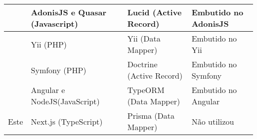 \begin{table}[h]
\begin{tabularx}{\textwidth}{ 
			| >{\hsize=0.4\hsize}X
			| >{\hsize=0.5\hsize}X	
			| >{\hsize=0.7\hsize}X
			| >{\hsize=0.4\hsize}X
			|
		}
     	\citeonline{dalapicola:2021} & 
		AdonisJS e Quasar (Javascript) &
		Lucid (Active Record)  &
		Embutido no AdonisJS \\ 
		\hline 
		
		\citeonline{berger:2021} & 
		Yii (PHP) &
		Yii  (Data Mapper)  &
		Embutido no Yii \\ 
		\hline 
		
		\citeonline{berger:2021} & 
		Symfony (PHP)  &
		Doctrine (Active Record)  &
		Embutido no Symfony \\ 
		\hline 
	
	    \citeonline{gomes:2022} & 
		Angular e NodeJS(JavaScript) &
		TypeORM (Data Mapper)  &
		Embutido no Angular\\ 
		\hline 

        Este &
        Next.js (TypeScript) &
        Prisma (Data Mapper) &
        Não utilizou \\
        \hline
		
	\end{tabularx}
\end{table}
